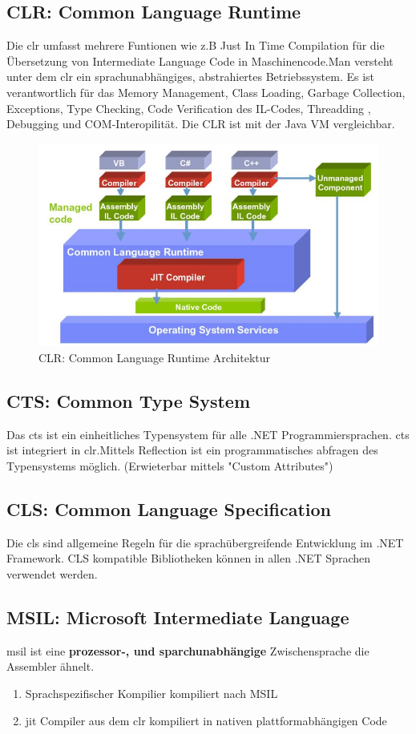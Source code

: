 \documentclass[
a4paper,
oneside,
10pt,
fleqn,
headsepline,
toc=listofnumbered, 
bibliography=totocnumbered]{scrartcl}
\begin{document}
\subsection{CLR: Common Language Runtime}
Die \gls{clr} umfasst mehrere Funtionen wie z.B Just In Time Compilation für die Übersetzung von Intermediate Language Code in Maschinencode.Man versteht unter dem \gls{clr} ein sprachunabhängiges, abstrahiertes Betriebssystem. Es ist verantwortlich für das Memory Management, Class Loading, Garbage Collection, Exceptions, Type Checking, Code Verification des IL-Codes, Threadding
, Debugging und COM-Interopilität. Die CLR ist mit der Java VM vergleichbar.
\begin{figure}[ht]
	\centering
	\includegraphics[width=0.6\linewidth]{images/common_language_runtime_architektur}
	\caption{CLR: Common Language Runtime Architektur}
	\label{fig:commonlanguageruntimearchitektur}
\end{figure}

\subsection{CTS: Common Type System}
Das \gls{cts} ist ein einheitliches Typensystem für alle .NET Programmiersprachen. \gls{cts} ist integriert in \gls{clr}.Mittels Reflection ist ein programmatisches abfragen des Typensystems möglich. (Erwieterbar mittels "Custom Attributes")

\subsection{CLS: Common Language Specification}
Die \gls{cls} sind allgemeine Regeln für die sprachübergreifende Entwicklung im .NET Framework. CLS kompatible Bibliotheken können in allen .NET Sprachen verwendet werden.

\subsection{MSIL: Microsoft Intermediate Language}
\gls{msil} ist eine \textbf{prozessor-, und sparchunabhängige} Zwischensprache die Assembler ähnelt.
\begin{enumerate}
	\item Sprachspezifischer Kompilier kompiliert nach MSIL
	\item \gls{jit} Compiler aus dem \gls{clr} kompiliert in nativen plattformabhängigen Code
\end{enumerate}
\end{document}
